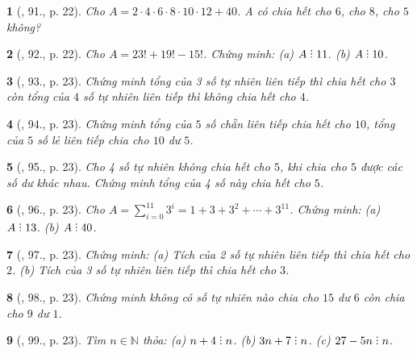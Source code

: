 \documentclass{article}
\newtheorem{baitoan}{}
\DeclareRobustCommand{\divby}{%
	\mathrel{\vbox{\baselineskip.65ex\lineskiplimit0pt\hbox{.}\hbox{.}\hbox{.}}}%
}
\begin{document}
\begin{baitoan}[\cite{Tuyen_Toan_6}, 91., p. 22]
	Cho $A = 2\cdot4\cdot6\cdot8\cdot10\cdot12 + 40$. A có chia hết cho $6$, cho $8$, cho $5$ không?
\end{baitoan}

\begin{baitoan}[\cite{Tuyen_Toan_6}, 92., p. 22]
	Cho $A = 23! + 19! - 15!$. Chứng minh: (a) $A\divby11$. (b) $A\divby10$.
\end{baitoan}

\begin{baitoan}[\cite{Tuyen_Toan_6}, 93., p. 23]
	Chứng minh tổng của 3 số tự nhiên liên tiếp thì chia hết cho $3$ còn tổng của $4$ số tự nhiên liên tiếp thì không chia hết cho $4$.
\end{baitoan}

\begin{baitoan}[\cite{Tuyen_Toan_6}, 94., p. 23]
	Chứng minh tổng của $5$ số chẵn liên tiếp chia hết cho $10$, tổng của $5$ số lẻ liên tiếp chia cho $10$ dư $5$.
\end{baitoan}

\begin{baitoan}[\cite{Tuyen_Toan_6}, 95., p. 23]
	Cho 4 số tự nhiên không chia hết cho $5$, khi chia cho $5$ được các số dư khác nhau. Chứng minh tổng của 4 số này chia hết cho $5$.
\end{baitoan}

\begin{baitoan}[\cite{Tuyen_Toan_6}, 96., p. 23]
	Cho $A = \sum_{i=0}^{11} 3^i = 1 + 3 + 3^2 + \cdots + 3^{11}$. Chứng minh: (a) $A\divby13$. (b) $A\divby40$.
\end{baitoan}

\begin{baitoan}[\cite{Tuyen_Toan_6}, 97., p. 23]
	Chứng minh: (a) Tích của 2 số tự nhiên liên tiếp thì chia hết cho $2$. (b) Tích của 3 số tự nhiên liên tiếp thì chia hết cho $3$.
\end{baitoan}

\begin{baitoan}[\cite{Tuyen_Toan_6}, 98., p. 23]
	Chứng minh không có số tự nhiên nào chia cho $15$ dư $6$ còn chia cho $9$ dư $1$.
\end{baitoan}

\begin{baitoan}[\cite{Tuyen_Toan_6}, 99., p. 23]
	Tìm $n\in\mathbb{N}$ thỏa: (a) $n + 4\divby n$. (b) $3n + 7\divby n$. (c) $27 - 5n\divby n$.
\end{baitoan}
\end{document}
